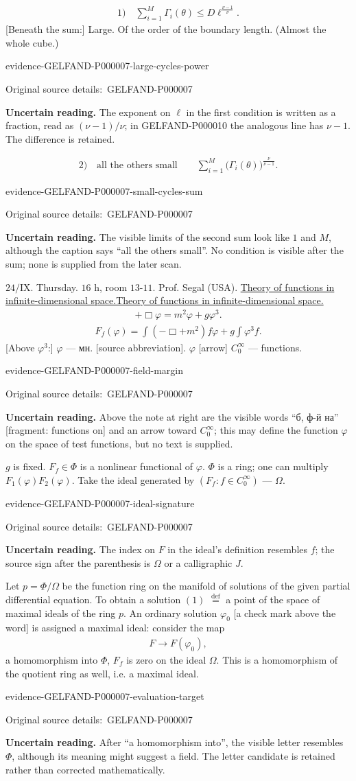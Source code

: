 \documentclass[11pt]{article}
\let\MathUnderline\underline
\renewcommand{\underline}[1]{\ifmmode\MathUnderline{#1}\else\uline{#1}\fi}
\newcommand{\EvidenceBlock}[4]{%
 \par\smallskip\noindent\begin{minipage}{\linewidth}
 \begin{minipage}[t]{.47\linewidth}\vspace{0pt}\centering
 \csname evidence-#1-#2\endcsname\par
 {\scriptsize\SourceCropCaption\ #1}\par
 \end{minipage}\hfill
 \begin{minipage}[t]{.49\linewidth}\vspace{0pt}\raggedright
 {\small\color{orange!65!black}\textbf{#4} #3}\par
 \end{minipage}
 \end{minipage}\par\smallskip}
\newcommand{\Unclear}[3]{\EvidenceBlock{#1}{#2}{#3}{\ReadingCaption}}
\newcommand{\SourceCropCaption}{Original source details:}\newcommand{\ReadingCaption}{Uncertain reading.}\newcommand{\IncompleteCaption}{Undeciphered passage.}\newcommand{\DiagramCaption}{Diagram and typed description.}
\begin{document}
\begin{gather*}
 1)\quad\sum_{i=1}^{M}\Gamma_i(\theta)
 \le D\ell^{\frac{\nu-1}{\nu}}.
\end{gather*}
[Beneath the sum:] Large.
Of the order of the boundary length. (Almost the whole cube.)
\Unclear{GELFAND-P000007}{large-cycles-power}{The exponent on $\ell$ in the first condition is written as a fraction, read as $(\nu-1)/\nu$; in GELFAND-P000010 the analogous line has $\nu-1$. The difference is retained.}
\begin{gather*}
 2)\quad\text{all the others small}\qquad
 \sum_{i=1}^{M}\bigl(\Gamma_i(\theta)\bigr)^{\frac\nu{\nu-1}}.
\end{gather*}
\Unclear{GELFAND-P000007}{small-cycles-sum}{The visible limits of the second sum look like $1$ and $M$, although the caption says ``all the others small''. No condition is visible after the sum; none is supplied from the later scan.}
[Dividing line.]

$24/\mathrm{IX}$.
Thursday. $16$ h, room $13$-$11$.
Prof. Segal (USA).
\underline{Theory of functions in infinite-dimensional space.}
\begin{gather*}
 +\Box\varphi=m^2\varphi+g\varphi^3.
\end{gather*}
\begin{gather*}
 F_f(\varphi)=\int(-\Box+m^2)f\varphi
 +g\int\varphi^3 f.
\end{gather*}
[Above $\varphi^3$:] $\varphi$ — мн. [source abbreviation].
$\varphi$ [arrow] $C_0^\infty$ — functions.
\Unclear{GELFAND-P000007}{field-margin}{Above the note at right are the visible words ``б, ф-й на'' [fragment: functions on] and an arrow toward $C_0^\infty$; this may define the function $\varphi$ on the space of test functions, but no text is supplied.}
$g$ is fixed.
$F_f\in\Phi$ is a nonlinear functional of $\varphi$.
$\Phi$ is a ring; one can multiply $F_1(\varphi)F_2(\varphi)$.
Take the ideal generated by $(F_f:f\in C_0^\infty)$ — $\Omega$.
\Unclear{GELFAND-P000007}{ideal-signature}{The index on $F$ in the ideal's definition resembles $f$; the source sign after the parenthesis is $\Omega$ or a calligraphic $J$.}
Let $p=\Phi/\Omega$ be the function ring on the manifold of solutions
of the given partial differential equation.
To obtain a solution $(1)$ $\overset{\mathrm{def}}=$
a point of the space of maximal ideals of the ring $p$.
An ordinary solution $\varphi_0$ [a check mark above the word] is assigned a maximal ideal: consider the map
\begin{gather*}
 F\longrightarrow F(\varphi_0),
\end{gather*}
a homomorphism into $\Phi$,
$F_f$ is zero on the ideal $\Omega$.
This is a homomorphism of the quotient ring as well, i.e. a maximal ideal.
\Unclear{GELFAND-P000007}{evaluation-target}{After ``a homomorphism into'', the visible letter resembles $\Phi$, although its meaning might suggest a field. The letter candidate is retained rather than corrected mathematically.}
\end{document}
